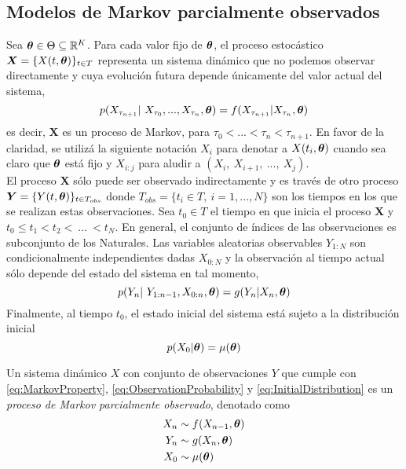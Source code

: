 \subsection{Modelos de Markov parcialmente observados}


Sea $\boldsymbol{\theta}\in\Theta\subseteq \mathbb R^K$. Para cada valor fijo de $\boldsymbol{\theta}$, el proceso estocástico $\boldsymbol{X} = \{X(t,\boldsymbol{\theta})\}_{t\in T}$ 
representa un sistema dinámico que no podemos observar directamente y cuya evolución futura depende únicamente del valor actual del sistema, 
\begin{equation}\label{eq:MarkovProperty}
    p(X_{\tau_{n+1}}|\ X_{\tau_0},...,X_{\tau_n},\boldsymbol{\theta}) = f(X_{\tau_{n+1}}|X_{\tau_n}, \boldsymbol{\theta})
\end{equation}
es decir, $\boldsymbol{X}$ es un proceso de Markov, para $\tau_0<...<\tau_n<\tau_{n+1}$. En favor de la claridad, se utilizá la siguiente notación $X_i$ para denotar a  $X(t_i, \boldsymbol{\theta})$ cuando sea claro que $\boldsymbol{\theta}$ está fijo 
y $X_{i:j}$ para aludir a $(X_i,\ X_{i+1},\ ...,\ X_j)$.\\

El proceso $\boldsymbol{X}$ sólo puede ser observado indirectamente y es través de otro proceso $\boldsymbol{Y} = \{Y(t, \boldsymbol{\theta})\}_{t\in T_{obs}}$ donde $T_{obs}=\{t_i\in 
T,\ i=1,...,N\}$ son los tiempos en los que se realizan estas observaciones. Sea $t_0\in T$ el tiempo en que inicia el proceso $\boldsymbol{X}$ y $t_0\leq t_1 < t_2 <\ ...\ <t_{N}$. En general, el conjunto de índices de las observaciones es subconjunto de los Naturales. Las variables aleatorias observables $Y_{1:N}$ son condicionalmente independientes dadas $X_{0:N}$ y la observación al tiempo actual sólo depende del estado del sistema en tal momento,
\begin{equation}\label{eq:ObservationProbability}
    p(Y_{n}|\ Y_{1:n-1}, X_{0:n}, \boldsymbol{\theta}) = g(Y_n| X_n, \boldsymbol{\theta}) 
\end{equation}
Finalmente, al tiempo $t_0$, el estado inicial del sistema está sujeto a la distribución inicial
\begin{equation}\label{eq:InitialDistribution}
    p(X_{0}|\boldsymbol{\theta}) = \mu(\boldsymbol{\theta})
\end{equation}

\begin{definition}
    Un sistema dinámico $X$ con conjunto de observaciones $Y$ que cumple con \ref{eq:MarkovProperty}, 
    \ref{eq:ObservationProbability} y \ref{eq:InitialDistribution} es un 
    \textit{proceso de Markov parcialmente observado}, denotado como 
    \begin{align}\label{eq:POMP}
       \begin{split}
        X_{n}&\sim f(X_{n-1},\boldsymbol{\theta})\\
        Y_{n}&\sim g(X_n,\boldsymbol{\theta})\\
        X_0&\sim\mu(\boldsymbol{\theta})
    \end{split} 
    \end{align}
\end{definition}

